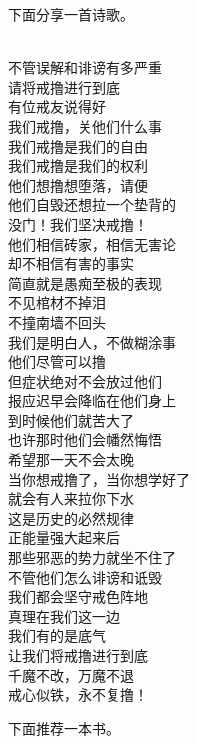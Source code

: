 下面分享一首诗歌。

\begin{poem}[将戒撸进行到底]
    \begin{multicols}{3}
        \centering~\\
        不管误解和诽谤有多严重 \\ 请将戒撸进行到底 \\ 有位戒友说得好 \\ 我们戒撸，关他们什么事 \\ 我们戒撸是我们的自由 \\ 我们戒撸是我们的权利 \\ 他们想撸想堕落，请便 \\ 他们自毁还想拉一个垫背的 \\ 没门！我们坚决戒撸！ \\ 他们相信砖家，相信无害论 \\ 却不相信有害的事实 \\ 简直就是愚痴至极的表现 \\ 不见棺材不掉泪 \\ 不撞南墙不回头 \\ 我们是明白人，不做糊涂事 \\ 他们尽管可以撸 \\ 但症状绝对不会放过他们 \\ 报应迟早会降临在他们身上 \\ 到时候他们就苦大了 \\ 也许那时他们会幡然悔悟 \\ 希望那一天不会太晚 \\ 当你想戒撸了，当你想学好了 \\ 就会有人来拉你下水 \\ 这是历史的必然规律 \\ 正能量强大起来后 \\ 那些邪恶的势力就坐不住了 \\ 不管他们怎么诽谤和诋毁 \\ 我们都会坚守戒色阵地 \\ 真理在我们这一边 \\ 我们有的是底气 \\ 让我们将戒撸进行到底 \\ 千魔不改，万魔不退 \\ 戒心似铁，永不复撸！
    \end{multicols}
\end{poem}

下面推荐一本书。

